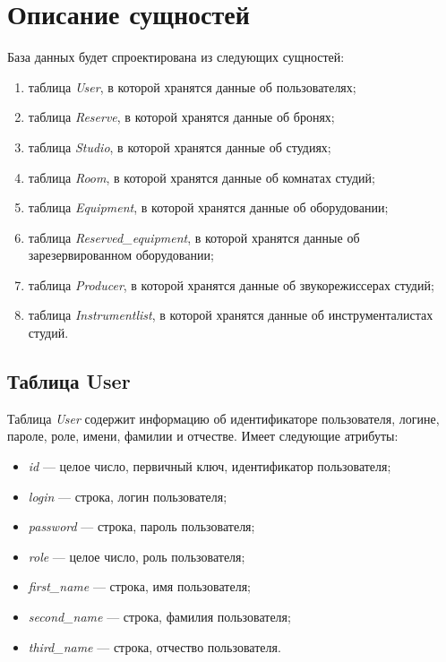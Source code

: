 \section{Описание сущностей}
База данных будет спроектирована из следующих сущностей:
\begin{enumerate}
	\item таблица \textit{User}, в которой хранятся данные об пользователях;
	\item таблица \textit{Reserve}, в которой хранятся данные об бронях;
	\item таблица \textit{Studio}, в которой хранятся данные об студиях;
	\item таблица \textit{Room}, в которой хранятся данные об комнатах студий;
	\item таблица \textit{Equipment}, в которой хранятся данные об оборудовании;
	\item таблица \textit{Reserved\_equipment}, в которой хранятся данные об зарезервированном оборудовании;
	\item таблица \textit{Producer}, в которой хранятся данные об звукорежиссерах студий;
	\item таблица \textit{Instrumentlist}, в которой хранятся данные об инструменталистах студий.
\end{enumerate}
\subsection{Таблица User}
Таблица \textit{User} содержит информацию об идентификаторе пользователя, логине, пароле, роле, имени, фамилии и отчестве.
Имеет следующие атрибуты:
\begin{itemize}
	\item \textit{id} --- целое число, первичный ключ, идентификатор пользователя;
	\item \textit{login} --- строка, логин пользователя;
	\item \textit{password} --- строка, пароль пользователя;
	\item \textit{role} --- целое число, роль пользователя;
	\item \textit{first\_name} --- строка, имя пользователя;
	\item \textit{second\_name} --- строка, фамилия пользователя;
	\item \textit{third\_name} --- строка, отчество пользователя.
\end{itemize}
